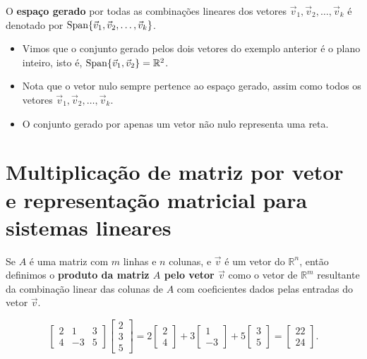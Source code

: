 O \textbf{espaço gerado} por todas as combinações lineares dos vetores $\vec{v}_1, \vec{v}_2, \dots, \vec{v}_k$ é denotado por $\operatorname{Span} \{ \vec{v}_1, \vec{v}_2, \dots, \vec{v}_k \}$.

\begin{itemize}
	\item Vimos que o conjunto gerado pelos dois vetores do exemplo anterior é o plano inteiro, isto é, $\operatorname{Span} \{ \vec{v}_1, \vec{v}_2 \} = \mathbb{R}^2$.
	\item Nota que o vetor nulo sempre pertence ao espaço gerado, assim como todos os vetores $\vec{v}_1, \vec{v}_2, \dots, \vec{v}_k$.
	\item O conjunto gerado por apenas um vetor não nulo representa uma reta.
\end{itemize}



\section{Multiplicação de matriz por vetor e representação matricial para sistemas lineares} 

Se $A$ é uma matriz com $m$ linhas e $n$ colunas, e $\vec{v}$ é um vetor do $\mathbb{R}^n$, então definimos o {\bf produto da matriz $A$ pelo vetor $\vec{v}$ } como o vetor de $\mathbb{R}^m$ resultante da combinação linear das colunas de $A$ com coeficientes dados pelas entradas do vetor $\vec{v}$.

\begin{ex}
	\begin{equation}
	\left[
	\begin{array}{ccc}
	2 &  1 & 3  \\
	4 & -3 & 5  
	\end{array}
	\right]
	\left[
	\begin{array}{c}
	2   \\
	3  \\
	5
	\end{array}
	\right] = 2
	\left[
	\begin{array}{c}
    2   \\
	4  
	\end{array}
	\right]
	+3 \left[
	\begin{array}{c}
	1   \\
	-3  
	\end{array}
	\right]+
	5
	\left[
	\begin{array}{c}
	3   \\
	5 	
	\end{array}
	\right]=
	\left[
	\begin{array}{c}
	22   \\
	24  
	\end{array}
	\right].
	\end{equation}
\end{ex}


